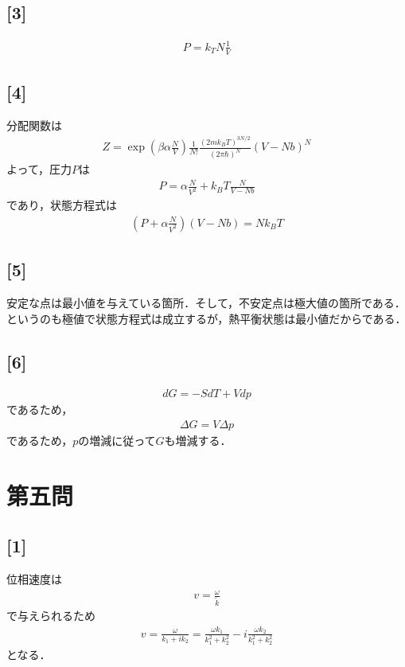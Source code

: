 \documentclass[12pt,dvipdfmx]{jsarticle}
\begin{document}
\subsection*{\large{[3]}}
\begin{eqnarray}
  P = k_TN\frac{1}{V}
\end{eqnarray}
\subsection*{\large{[4]}}
分配関数は
\begin{eqnarray}
  Z = \exp\left( \beta\alpha\frac{N}{V} \right)\frac{1}{N!}\frac{(2mk_BT)^{3N/2}}{(2\pi\hbar)^N}(V-Nb)^N
\end{eqnarray}
よって，圧力$P$は
\begin{eqnarray}
  P =\alpha\frac{N}{V^2} + k_B T \frac{N}{V-Nb}
\end{eqnarray}
であり，状態方程式は
\begin{eqnarray}
  \left( P + \alpha\frac{N}{V^2} \right)(V-Nb) = Nk_B T
\end{eqnarray}
\subsection*{\large{[5]}}
安定な点は最小値を与えている箇所．そして，不安定点は極大値の箇所である．というのも極値で状態方程式は成立するが，熱平衡状態は最小値だからである．
\subsection*{\large{[6]}}
\begin{eqnarray}
  dG= -SdT + Vdp
\end{eqnarray}
であるため，
\begin{eqnarray}
  \Delta G = V\Delta p
\end{eqnarray}
であるため，$p$の増減に従って$G$も増減する．
\newpage
\section*{\Large{第五問}}
\subsection*{\large{[1]}}
位相速度は
\begin{eqnarray}
  v = \frac{\omega}{\tilde{k}}
\end{eqnarray}
で与えられるため
\begin{eqnarray}
  v = \frac{\omega}{k_1 + ik_2} = \frac{\omega k_1}{k_1^2 + k_2^2} - i\frac{\omega k_2}{k_1^2 + k_2^2}
\end{eqnarray}
となる．
\end{document}
